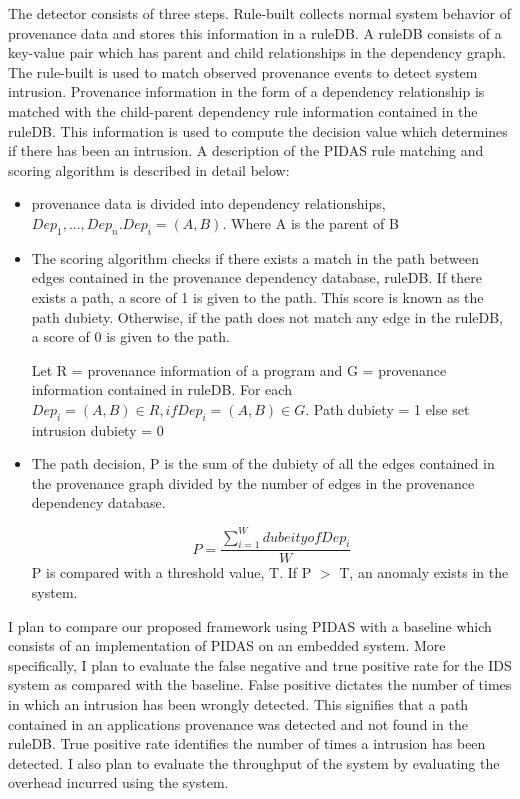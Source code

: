 The detector consists of three steps. Rule-built collects normal system behavior of provenance data and stores this information in a ruleDB. A ruleDB consists of a key-value pair which has parent and child relationships in the dependency graph. The rule-built is used to match observed provenance events  to detect system intrusion. Provenance information in the form of a dependency relationship is matched with the child-parent dependency rule information contained in the ruleDB. This information is used to compute the decision value which determines if there has been an intrusion. A description of the PIDAS rule matching and scoring algorithm is described in detail below: 

\begin{itemize}

\item provenance data is divided into dependency relationships, $Dep_1,...,Dep_n. Dep_i =(A, B)$. Where A is the parent of B

\item The scoring algorithm checks if there exists a match in the path between edges contained in the provenance dependency database, ruleDB. If there exists a path, a score of 1 is given to the path. This score is known as the path dubiety. Otherwise, if the path does not match any edge in the ruleDB, a score of 0 is given to the path.

Let R = provenance information of a program and G = provenance information contained in ruleDB. For each $Dep_i = (A, B) \in R, if Dep_i = (A, B) \in G$. Path dubiety = 1 else set intrusion dubiety = 0

\item The path decision, P is the sum of the dubiety of all the edges contained in the provenance graph divided by the number of edges in the provenance dependency database.

 \[P =\frac{\sum\limits_{i=1}^W dubeity of Dep_i }{W} \] P is compared with a threshold value, T. If P $>$ T, an anomaly exists in the system.

\end{itemize}

I plan to compare our proposed framework using PIDAS with a baseline which consists of an implementation of PIDAS on an embedded system. More specifically, I plan to evaluate the false negative and true positive rate for the IDS system as compared with the baseline. False positive dictates the number of times in which an intrusion has been wrongly detected. This signifies that a path contained in an applications provenance was detected and not found in the ruleDB. True positive rate identifies the number of times a intrusion has been detected. I also plan to evaluate the throughput of the system by evaluating the overhead incurred using the system.



%
